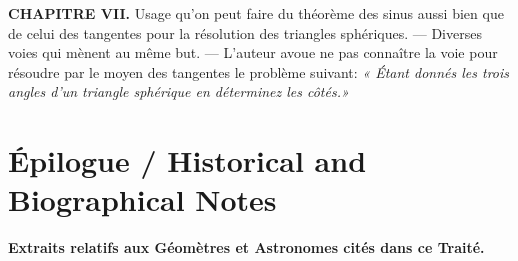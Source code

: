 \documentclass[11pt,a4paper]{article}
\theoremstyle{plain}
\theoremstyle{definition}
\theoremstyle{remark}
\begin{document}
\textbf{CHAPITRE VII.} Usage qu'on peut faire du théorème des sinus aussi bien que de celui des tangentes pour la résolution des triangles sphériques. --- Diverses voies qui mènent au même but. --- L'auteur avoue ne pas connaître la voie pour résoudre par le moyen des tangentes le problème suivant: \textit{« Étant donnés les trois angles d'un triangle sphérique en déterminez les côtés.»}





\clearpage






\section*{Épilogue / Historical and Biographical Notes}






\textbf{Extraits relatifs aux Géomètres et Astronomes cités dans ce Traité.}
\end{document}
